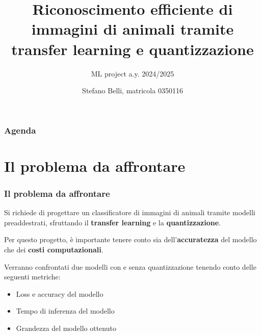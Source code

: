 \documentclass{beamer}
\title[Transfer learning e quantizzazione]
{Riconoscimento efficiente di immagini di animali tramite transfer learning e quantizzazione}
\subtitle{ML project a.y. 2024/2025}
\author[Stefano Belli, 0350116]{Stefano Belli, matricola 0350116}
\institute[uniroma2]{Università degli Studi di Roma "Tor Vergata"}
\date{}
\newcommand{\dflvspace}{\vspace{10pt}}
\begin{document}
\begin{frame}
    \titlepage
\end{frame}

\begin{frame}
    \frametitle{Agenda}
    \tableofcontents
\end{frame}

\section{Il problema da affrontare}
\begin{frame}
    \frametitle{Il problema da affrontare}
    
    Si richiede di progettare un classificatore di immagini di animali tramite
    modelli preaddestrati, sfruttando il \textbf{transfer learning} e la \textbf{quantizzazione}.
    
    \dflvspace
    
    Per questo progetto, è importante tenere conto sia dell'\textbf{accuratezza} del modello
    che dei \textbf{costi computazionali}.
    
    \dflvspace
    
    Verranno confrontati due modelli con e senza
    quantizzazione tenendo conto delle seguenti metriche:
    
    \dflvspace
    
    \begin{itemize}
    	\item Loss e accuracy del modello
    	\item Tempo di inferenza del modello
    	\item Grandezza del modello ottenuto
    \end{itemize}
    
\end{frame}
\end{document}
